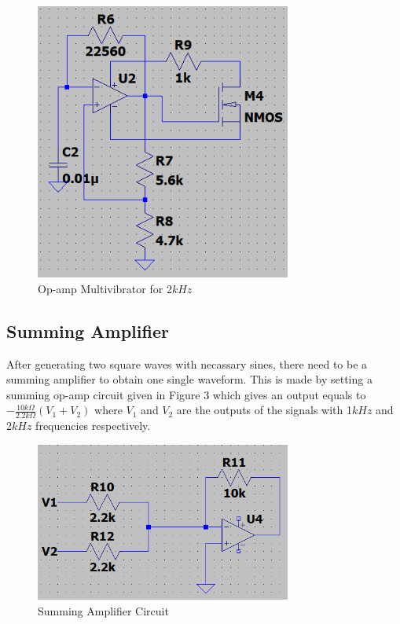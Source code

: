 \documentclass[letterpaper,12pt]{article}
\begin{document}
\begin{figure}[H]
    \centering
    \includegraphics[width = 0.75\textwidth]{2K.png}
    \caption{Op-amp Multivibrator for 2\(kHz\)}
\end{figure} 


\subsection{Summing Amplifier}
After generating two square waves with necassary sines, there need to be a summing amplifier to obtain one single waveform. This is made by setting a summing op-amp circuit given in Figure 3 which gives an output equals to \(- \frac{10k\Omega }{2.2k\Omega }(V_1 + V_2)\) where \(V_1\) and \(V_2\) are the outputs of the signals with  1\(kHz\) and 2\(kHz\) frequencies respectively.


\begin{figure}[H]
    \centering
    \includegraphics[width = 0.75\textwidth]{SUMM.png}
    \caption{Summing Amplifier Circuit}
\end{figure} 
\end{document}
